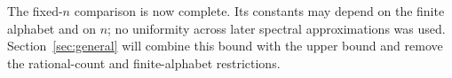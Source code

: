 The fixed-$n$ comparison is now complete.  Its constants may depend on
the finite alphabet and on $n$; no uniformity across later spectral
approximations was used.  Section~\ref{sec:general} will combine this
bound with the upper bound and remove the rational-count and
finite-alphabet restrictions.
